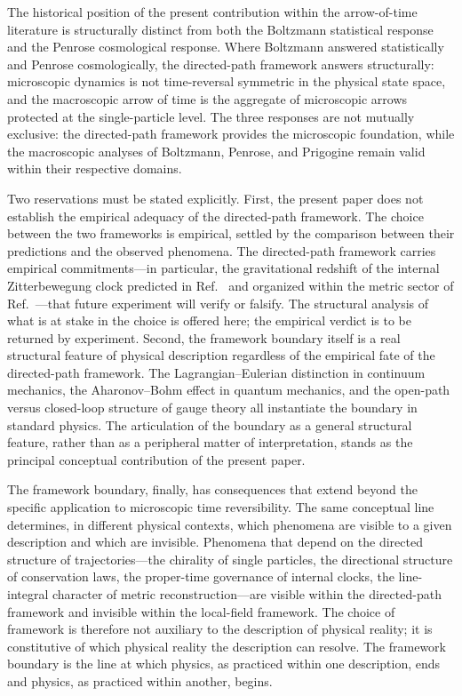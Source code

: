 \documentclass[%
 reprint, amsmath,amssymb, aps, prb, ]{revtex4-2}
\numberwithin{equation}{section}
\begin{document}
The historical position of the present contribution within the arrow-of-time literature is structurally distinct from both the Boltzmann statistical response and the Penrose cosmological response. Where Boltzmann answered statistically and Penrose cosmologically, the directed-path framework answers structurally: microscopic dynamics is not time-reversal symmetric in the physical state space, and the macroscopic arrow of time is the aggregate of microscopic arrows protected at the single-particle level. The three responses are not mutually exclusive: the directed-path framework provides the microscopic foundation, while the macroscopic analyses of Boltzmann, Penrose, and Prigogine remain valid within their respective domains.

Two reservations must be stated explicitly. First, the present paper does not establish the empirical adequacy of the directed-path framework. The choice between the two frameworks is empirical, settled by the comparison between their predictions and the observed phenomena. The directed-path framework carries empirical commitments---in particular, the gravitational redshift of the internal Zitterbewegung clock predicted in Ref.~\cite{hanamura22} and organized within the metric sector of Ref.~\cite{hanamura55}---that future experiment will verify or falsify. The structural analysis of what is at stake in the choice is offered here; the empirical verdict is to be returned by experiment. Second, the framework boundary itself is a real structural feature of physical description regardless of the empirical fate of the directed-path framework. The Lagrangian--Eulerian distinction in continuum mechanics, the Aharonov--Bohm effect in quantum mechanics, and the open-path versus closed-loop structure of gauge theory all instantiate the boundary in standard physics. The articulation of the boundary as a general structural feature, rather than as a peripheral matter of interpretation, stands as the principal conceptual contribution of the present paper.

The framework boundary, finally, has consequences that extend beyond the specific application to microscopic time reversibility. The same conceptual line determines, in different physical contexts, which phenomena are visible to a given description and which are invisible. Phenomena that depend on the directed structure of trajectories---the chirality of single particles, the directional structure of conservation laws, the proper-time governance of internal clocks, the line-integral character of metric reconstruction---are visible within the directed-path framework and invisible within the local-field framework. The choice of framework is therefore not auxiliary to the description of physical reality; it is constitutive of which physical reality the description can resolve. The framework boundary is the line at which physics, as practiced within one description, ends and physics, as practiced within another, begins.
\end{document}
